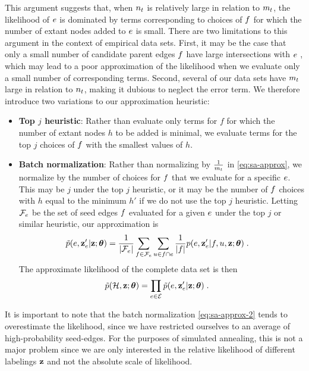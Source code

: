 \documentclass[aps,pre,reprint,superscriptaddress,nofootinbib]{revtex4-2}
\begin{document}
        This argument suggests that, when $n_{t}$ is relatively large in relation to $m_{t}$, the likelihood of $e$ is dominated by terms corresponding to choices of $f$ for which the number of extant nodes added to $e$ is small.
        There are two limitations to this argument in the context of empirical data sets. 
        First, it may be the case that only a small number of candidate parent edges $f$ have large intersections with $e$ , which may lead to a poor approximation of the likelihood when we evaluate only a small number of corresponding terms.
        Second, several of our data sets have $m_{t}$ large in relation to $n_{t}$, making it dubious to neglect the error term. 
        We therefore introduce two variations to our approximation heuristic: 
        \begin{itemize}
            \item \textbf{Top $j$ heuristic}: Rather than evaluate only terms for $f$ for which the number of extant nodes $h$ to be added is minimal, we evaluate terms for the top $j$ choices of $f$ with the smallest values of $h$.
            \item \textbf{Batch normalization}: Rather than normalizing by $\frac{1}{m_{t}}$ in \cref{eq:sa-approx}, we normalize by the number of  choices for $f$ that we evaluate for a specific $e$. 
            This may be $j$ under the top $j$ heuristic, or it may be the number of $f$ choices with $h$ equal to the minimum $h'$ if we do not use the top $j$ heuristic. 
            Letting $\mathcal{F}_e$ be the set of seed edges $f$ evaluated for a given $e$ under the top $j$ or similar heuristic, our approximation is 
            \begin{align}
                \tilde{p}(e,\mathbf{z}_e'|\mathbf{z};\boldsymbol{\theta}) &=\frac{1}{|\mathcal{F}_e|}\sum_{\substack{f \in \mathcal{F}_e}} \sum_{u \in f \cap e} \frac{1}{|f|}  p(e,\mathbf{z}_e' | f, u, \mathbf{z}; \boldsymbol{\theta})\;. 
            \end{align}
            The approximate likelihood of the complete data set is then 
            \begin{align}
                 \tilde{p} (\mathcal{H}, \mathbf{z}; \boldsymbol{\theta} )&= \prod_{e \in \mathcal{E}}\tilde{p}(e,\mathbf{z}_e'|\mathbf{z};\boldsymbol{\theta})\;. \label{eq:sa-approx-2}
            \end{align}
        \end{itemize}
        It is important to note that the batch normalization \cref{eq:sa-approx-2} tends to overestimate the likelihood, since we have restricted ourselves to an average of high-probability seed-edges. 
        For the purposes of simulated annealing, this is not a major problem since we are only interested in the relative likelihood of different labelings $\mathbf{z}$ and not the absolute scale of likelihood.
\end{document}
